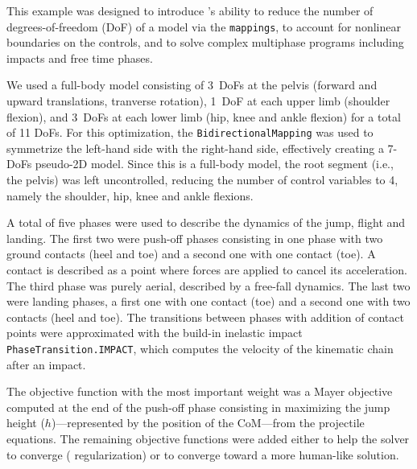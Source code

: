 This example was designed to introduce \bioptim's ability to reduce the number of degrees-of-freedom (DoF) of a model via the \texttt{mappings}, to account for nonlinear boundaries on the controls, and to solve complex multiphase programs including impacts and free time phases.

We used a full-body model consisting of 3~DoFs at the pelvis (forward and upward translations, tranverse rotation), 1~DoF at each upper limb (shoulder flexion), and 3~DoFs at each lower limb (hip, knee and ankle flexion) for a total of 11 DoFs.
For this optimization, the \texttt{BidirectionalMapping} was used to symmetrize the left-hand side with the right-hand side, effectively creating a 7-DoFs pseudo-2D model. 
Since this is a full-body model, the root segment (i.e., the pelvis) was left uncontrolled, reducing the number of control variables to 4, namely the shoulder, hip, knee and ankle flexions. 

A total of five phases were used to describe the dynamics of the jump, flight and landing. 
The first two were push-off phases consisting in one phase with two ground contacts (heel and toe) and a second one with one contact (toe). 
A contact is described as a point where forces are applied to cancel its acceleration. 
The third phase was purely aerial, described by a free-fall dynamics.
The last two were landing phases, a first one with one contact (toe) and a second one with two contacts (heel and toe).
The transitions between phases with addition of contact points were approximated with the build-in inelastic impact \texttt{PhaseTransition.IMPACT}, which computes the velocity of the kinematic chain after an impact.

The objective function with the most important weight was a Mayer objective computed at the end of the push-off phase consisting in maximizing the jump height ($h$)---represented by the position of the CoM---from the projectile equations.
The remaining objective functions were added either to help the solver to converge ( regularization) or to converge toward a more human-like solution. 

